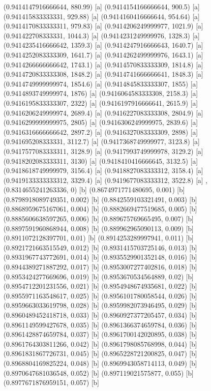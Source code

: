 {{{(0.9414147916666644, 880.99) [a] 
(0.9414154166666644, 900.5) [a] 
(0.941415833333331, 929.88) [a] 
(0.9414160416666644, 954.64) [a] 
(0.9414170833333311, 979.83) [a] 
(0.9414206249999977, 1021.9) [a] 
(0.941422708333331, 1044.3) [a] 
(0.9414231249999976, 1328.3) [a] 
(0.9414235416666642, 1359.3) [a] 
(0.9414247916666643, 1640.7) [a] 
(0.9414252083333309, 1641.7) [a] 
(0.9414262499999976, 1643.1) [a] 
(0.9414266666666642, 1743.1) [a] 
(0.9414570833333309, 1814.8) [a] 
(0.9414720833333308, 1848.2) [a] 
(0.9414741666666641, 1848.3) [a] 
(0.9414749999999974, 1854.6) [a] 
(0.9414845833333307, 1855) [a] 
(0.9414893749999974, 1876) [a] 
(0.9416064583333308, 2158.3) [a] 
(0.9416195833333307, 2322) [a] 
(0.9416197916666641, 2615.9) [a] 
(0.9416206249999974, 2689.4) [a] 
(0.9416227083333308, 2804.9) [a] 
(0.9416299999999975, 2805) [a] 
(0.9416306249999975, 2839.6) [a] 
(0.9416316666666642, 2897.2) [a] 
(0.9416327083333309, 2898) [a] 
(0.941695208333331, 3112.7) [a] 
(0.9417368749999977, 3123.8) [a] 
(0.9417577083333311, 3128.9) [a] 
(0.9417993749999978, 3129.2) [a] 
(0.9418202083333311, 3130) [a] 
(0.9418410416666645, 3132.5) [a] 
(0.9418618749999979, 3156.4) [a] 
(0.9418827083333312, 3158.4) [a] 
(0.9419133333333312, 3329.4) [a] 
(0.9419677083333312, 3522.8) [a] 
},{(0.8314655241263336, 0) [b] 
(0.8674971771480695, 0.001) [b] 
(0.8798918089749351, 0.002) [b] 
(0.8842559103321491, 0.003) [b] 
(0.8868959675167061, 0.004) [b] 
(0.8882669477519685, 0.005) [b] 
(0.8885606638597265, 0.006) [b] 
(0.889675769665495, 0.007) [b] 
(0.8897591960868944, 0.008) [b] 
(0.889962965090113, 0.009) [b] 
(0.8911072128397701, 0.01) [b] 
(0.8914253289997941, 0.011) [b] 
(0.8921721663515549, 0.012) [b] 
(0.8931415703725146, 0.013) [b] 
(0.8931967743772691, 0.014) [b] 
(0.8935529901352148, 0.016) [b] 
(0.8944389271887292, 0.017) [b] 
(0.8953007277402816, 0.018) [b] 
(0.8953424277669696, 0.019) [b] 
(0.8953670534564889, 0.02) [b] 
(0.8954712201231556, 0.021) [b] 
(0.8954948674935681, 0.022) [b] 
(0.8955971163548617, 0.025) [b] 
(0.8956101780058544, 0.026) [b] 
(0.8959663033619798, 0.028) [b] 
(0.8959982073946495, 0.029) [b] 
(0.8960489452418718, 0.033) [b] 
(0.8960927377205457, 0.034) [b] 
(0.8961149599427678, 0.035) [b] 
(0.8961366374659784, 0.036) [b] 
(0.8961428874659784, 0.037) [b] 
(0.8961700142020895, 0.038) [b] 
(0.8961764303811266, 0.042) [b] 
(0.8961798085768998, 0.044) [b] 
(0.8961831867726731, 0.045) [b] 
(0.8965228721200825, 0.047) [b] 
(0.8968804169825224, 0.048) [b] 
(0.8969943058714113, 0.049) [b] 
(0.8970647681036548, 0.052) [b] 
(0.897119021575877, 0.055) [b] 
(0.8977671876959151, 0.057) [b] 
}}}
